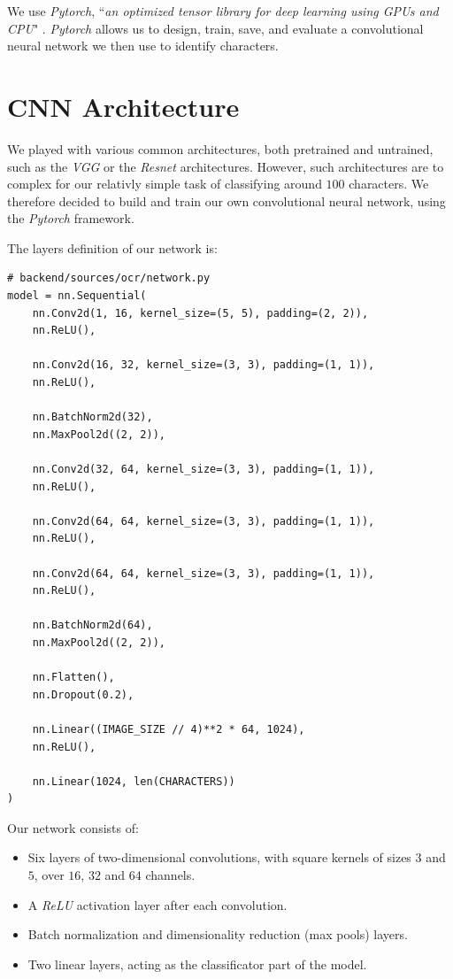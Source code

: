 \documentclass[11pt, a4paper]{report}
\begin{document}
We use \textit{Pytorch}, ``\textit{an optimized tensor library for deep learning using GPUs and CPU}" \cite{pytorch}. \textit{Pytorch} allows us to design, train, save, and evaluate a convolutional neural network we then use to identify characters.

\section{CNN Architecture}

We played with various common architectures, both pretrained and untrained, such as the \textit{VGG} \cite{VGG} or the \textit{Resnet} \cite{resnet} architectures.
However, such architectures are to complex for our relativly simple task of classifying around $100$ characters. We therefore decided to build and train our own convolutional neural network, using the \textit{Pytorch} framework.

The layers definition of our network is:

\begin{verbatim}
# backend/sources/ocr/network.py
model = nn.Sequential(
    nn.Conv2d(1, 16, kernel_size=(5, 5), padding=(2, 2)),
    nn.ReLU(),
    
    nn.Conv2d(16, 32, kernel_size=(3, 3), padding=(1, 1)),
    nn.ReLU(),
    
    nn.BatchNorm2d(32),
    nn.MaxPool2d((2, 2)),
    
    nn.Conv2d(32, 64, kernel_size=(3, 3), padding=(1, 1)),
    nn.ReLU(),
    
    nn.Conv2d(64, 64, kernel_size=(3, 3), padding=(1, 1)),
    nn.ReLU(),
    
    nn.Conv2d(64, 64, kernel_size=(3, 3), padding=(1, 1)),
    nn.ReLU(),

    nn.BatchNorm2d(64),
    nn.MaxPool2d((2, 2)),

    nn.Flatten(),
    nn.Dropout(0.2),

    nn.Linear((IMAGE_SIZE // 4)**2 * 64, 1024),
    nn.ReLU(),

    nn.Linear(1024, len(CHARACTERS))
)
\end{verbatim}

Our network consists of:
\begin{itemize}
	\item Six layers of two-dimensional convolutions, with square kernels of sizes $3$ and $5$, over $16$, $32$ and $64$ channels.
	\item A \textit{ReLU} \cite{ReLU} activation layer after each convolution.
	\item Batch normalization and dimensionality reduction (max pools) layers.
	\item Two linear layers, acting as the classificator part of the model.
\end{itemize}
\end{document}
